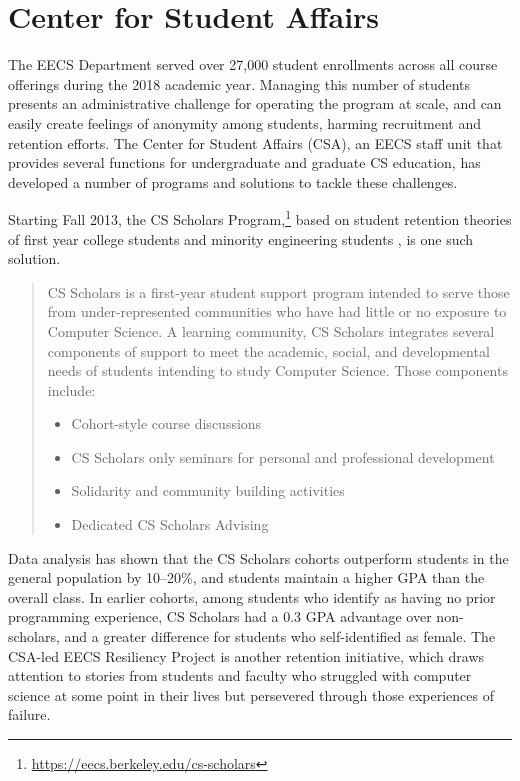 \section{Center for Student Affairs}

The EECS Department served over 27,000 student enrollments across all course offerings during the 2018 academic year. Managing this number of students presents an administrative challenge for operating the program at scale, and can easily create feelings of anonymity among students, harming recruitment and retention efforts. The Center for Student Affairs (CSA), an EECS staff unit that provides several functions for undergraduate and graduate CS education, has developed a number of programs and solutions to tackle these challenges.

Starting Fall 2013, the CS Scholars Program,\footnote{\url{https://eecs.berkeley.edu/cs-scholars}} based on student retention theories of first year college students \cite{Tinto:1987, Terenzini:1980} and minority engineering students \cite{Treisman:1992}, is one such solution.
\begin{quote}
    CS Scholars is a first-year student support program intended to serve those from under-represented communities who have had little or no exposure to Computer Science. A learning community, CS Scholars integrates several components of support to meet the academic, social, and developmental needs of students intending to study Computer Science. Those components include:
    \begin{itemize}
    \item Cohort-style course discussions
    \item CS Scholars only seminars for personal and professional development
    \item Solidarity and community building activities
    \item Dedicated CS Scholars Advising
    \end{itemize}
\end{quote}
Data analysis has shown that the CS Scholars cohorts outperform students in the general population by 10--20\%, and students maintain a higher GPA than the overall class. In earlier cohorts, among students who identify as having no prior programming experience, CS Scholars had a 0.3 GPA advantage over non-scholars, and a greater difference for students who self-identified as female. The CSA-led EECS Resiliency Project is another retention initiative, which draws attention to stories from students and faculty who struggled with computer science at some point in their lives but persevered through those experiences of failure.

